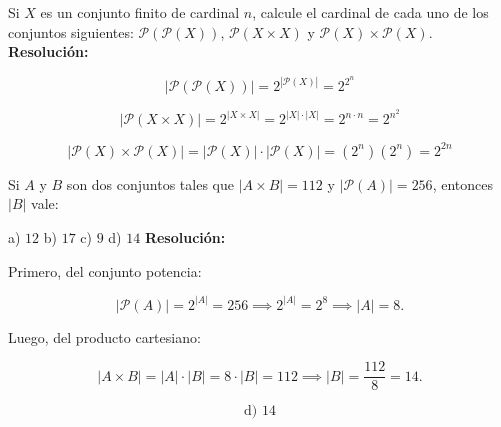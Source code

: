\documentclass[a4paper,12pt]{article}
\begin{document}
\begin{ejercicio}[title=Ejercicio 2]
Si $X$ es un conjunto finito de cardinal $n$, calcule el cardinal de cada uno de los conjuntos
siguientes: $\mathcal{P}(\mathcal{P}(X))$, $\mathcal{P}(X\times X)$ y $\mathcal{P}(X)\times \mathcal{P}(X)$.
\tcblower
\textbf{Resolución:}

\[
|\mathcal{P}(\mathcal{P}(X))| = 2^{|\mathcal{P}(X)|} = \boxed{2^{2^n}}
\]

\[
|\mathcal{P}(X\times X)| = 2^{|X\times X|} = 2^{|X|\cdot|X|} = 2^{n\cdot n} = \boxed{2^{n^2}}
\]

\[
|\mathcal{P}(X)\times \mathcal{P}(X)| = |\mathcal{P}(X)|\cdot|\mathcal{P}(X)| = (2^n)(2^n) = \boxed{2^{2n}}
\]

\end{ejercicio}

\begin{ejercicio}[title=Ejercicio 3]
Si $A$ y $B$ son dos conjuntos tales que $|A\times B|=112$ y $|\mathcal{P}(A)|=256$, entonces $|B|$ vale:

a) $12$ \quad b) $17$ \quad c) $9$ \quad d) $14$
\tcblower
\textbf{Resolución:}

Primero, del conjunto potencia:

\[
|\mathcal{P}(A)| = 2^{|A|} = 256 \implies 2^{|A|} = 2^8 \implies |A| = 8.
\]

Luego, del producto cartesiano:

\[
|A \times B| = |A|\cdot|B| = 8 \cdot |B| = 112 \implies |B| = \frac{112}{8} = 14.
\]

\[
\boxed{\text{d) } 14}
\]

\end{ejercicio}
\end{document}
